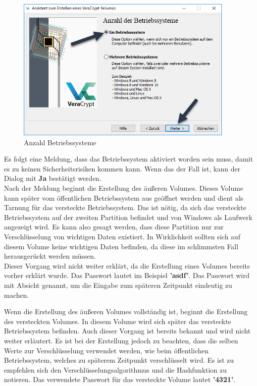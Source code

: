 \documentclass[12pt,a4paper]{scrreprt}
\begin{document}
\begin{figure}[h]
\begin{center}
\includegraphics[width=300pt]{media/oscount.png}
\caption{Anzahl Betriebssysteme}
\label{hboscount}
\end{center}
\end{figure}

\noindent Es folgt eine Meldung, dass das Betriebssystem aktiviert worden sein muss, damit es zu keinen Sicherheitsrisiken kommen kann. Wenn das der Fall ist, kann der Dialog mit \textbf{Ja} bestätigt werden. \\

\noindent Nach der Meldung beginnt die Erstellung des äußeren Volumes. Dieses Volume kann später vom öffentlichen Betriebssystem aus geöffnet werden und dient als Tarnung für das versteckte Betriebssystem. Das ist nötig, da sich das versteckte Betriebssystem auf der zweiten Partition befindet und von Windows als Laufwerk angezeigt wird. Es kann also gesagt werden, dass diese Partition nur zur Verschlüsselung von wichtigen Daten existiert. In Wirklichkeit sollten sich auf diesem Volume keine wichtigen Daten befinden, da diese im schlimmsten Fall herausgerückt werden müssen. \\

\noindent Dieser Vorgang wird nicht weiter erklärt, da die Erstellung eines Volumes bereits vorher erklärt wurde. Das Passwort lautet im Beispiel \textbf{'asdf'}. Das Passwort wird mit Absicht genannt, um die Eingabe zum späteren Zeitpunkt eindeutig zu machen.

\newpage 

\noindent Wenn die Erstellung des äußeren Volumes vollständig ist, beginnt die Erstellung des versteckten Volumes. In diesem Volume wird sich später das versteckte Betriebssystem befinden. Auch dieser Vorgang ist bereits bekannt und wird nicht weiter erläutert. Es ist bei der Erstellung jedoch zu beachten, dass die selben Werte zur Verschlüsselung verwendet werden, wie beim öffentlichen Betriebssystem, welches zu späterem Zeitpunkt verschlüsselt wird. Es ist zu empfehlen sich den Verschlüsselungsalgorithmus und die Hashfunktion zu notieren. Das verwendete Passwort für das versteckte Volume lautet \textbf{'4321'}. \\
\end{document}
